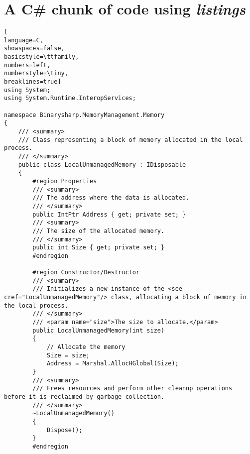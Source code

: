 \documentclass[a4paper]{article}
\begin{document}
\newpage
\section*{A C\# chunk of code using \emph{listings}}
\begin{lstlisting}[
language=C,
showspaces=false,
basicstyle=\ttfamily,
numbers=left,
numberstyle=\tiny,
breaklines=true]
using System;
using System.Runtime.InteropServices;

namespace Binarysharp.MemoryManagement.Memory
{
    /// <summary>
    /// Class representing a block of memory allocated in the local process.
    /// </summary>
    public class LocalUnmanagedMemory : IDisposable
    {
        #region Properties
        /// <summary>
        /// The address where the data is allocated.
        /// </summary>
        public IntPtr Address { get; private set; }
        /// <summary>
        /// The size of the allocated memory.
        /// </summary>
        public int Size { get; private set; }
        #endregion

        #region Constructor/Destructor
        /// <summary>
        /// Initializes a new instance of the <see cref="LocalUnmanagedMemory"/> class, allocating a block of memory in the local process.
        /// </summary>
        /// <param name="size">The size to allocate.</param>
        public LocalUnmanagedMemory(int size)
        {
            // Allocate the memory
            Size = size;
            Address = Marshal.AllocHGlobal(Size);
        }
        /// <summary>
        /// Frees resources and perform other cleanup operations before it is reclaimed by garbage collection.
        /// </summary>
        ~LocalUnmanagedMemory()
        {
            Dispose();
        }
        #endregion


\end{lstlisting}
\end{document}
